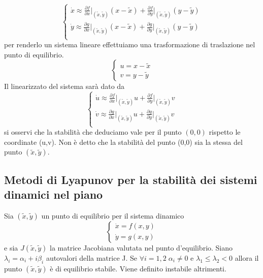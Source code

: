 \begin{equation*}
	\left \{ \begin{array}{l}
		\dot{x} \approx \frac{\partial f}{\partial x}\big |_{(\tilde{x},\tilde{y})}(x-\tilde{x}) + \frac{\partial f}{\partial y}\big |_{(\tilde{x},\tilde{y})}(y-\tilde{y})\\[0.1in] 
		\dot{y} \approx  \frac{\partial g}{\partial x}\big |_{(\tilde{x},\tilde{y})}(x-\tilde{x}) + \frac{\partial g}{\partial y}\big |_{(\tilde{x},\tilde{y})}(y-\tilde{y})\\ 
	\end{array} \right.
\end{equation*}
per renderlo un sistema lineare effettuiamo una trasformazione di traslazione nel punto di equilibrio.
\begin{equation*}
	\left \{ \begin{array}{l}
		u = x-\tilde{x}\\
		v = y - \tilde{y}
	\end{array}\right.
\end{equation*}
Il linearizzato del sistema sar\`{a} dato da 
\begin{equation}
		\left \{ \begin{array}{l}
		\dot{u} \approx \frac{\partial f}{\partial x}\big |_{(\tilde{x},\tilde{y})}u + \frac{\partial f}{\partial y}\big |_{(\tilde{x},\tilde{y})}v\\[0.1in] 
		\dot{v} \approx  \frac{\partial g}{\partial x}\big |_{(\tilde{x},\tilde{y})}u + \frac{\partial g}{\partial y}\big |_{(\tilde{x},\tilde{y})}v\\ 
	\end{array} \right.
\end{equation}
si osservi che la stabilit\`{a} che deduciamo vale per il punto $(0,0)$ rispetto le coordinate (u,v). Non \`{e} detto che la stabilit\`{a} del punto (0,0) sia la stessa del punto $(\tilde{x},\tilde{y})$.
\newpage 
\subsection{Metodi di Lyapunov per la stabilit\`{a} dei sistemi dinamici nel piano}

\begin{theorem}
	Sia $(\tilde{x},\tilde{y})$ un punto di equilibrio per il sistema dinamico 
	\begin{equation*}
		\left \{ \begin{array}{l}
			\dot{x} = f(x,y)\\
			\dot{y} = g(x,y)
		\end{array} \right.
	\end{equation*}
e sia $J(\tilde{x},\tilde{y})$ la matrice Jacobiana valutata nel punto d'equilibrio. Siano $\lambda_i = \alpha_i + i\beta_i$ autovalori della matrice J. Se $\forall i=1,2\;\alpha_i \neq 0$  e $\lambda_1 \leq \lambda_2 < 0$ allora il punto $(\tilde{x},\tilde{y})$ \`{e} di equilibrio stabile. Viene definito instabile altrimenti.
\end{theorem}

